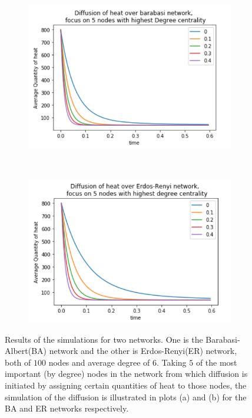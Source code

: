 \documentclass[10pt,a4paper]{article}
\begin{document}
\begin{figure}[!h]
	\centering
	\begin{subfigure}[b]{0.45\textwidth}
		\includegraphics[width= \textwidth]{images/barabasi-average.png}
		\caption{}
		\label{}
	\end{subfigure}~
	\begin{subfigure}[b]{0.45\textwidth}
		\includegraphics[width= \textwidth]{images/E-R-average.png}
		\caption{}
		\label{}
	\end{subfigure}
    \caption{ Results of the simulations for two networks. One is the Barabasi-Albert(BA) network and  the other is Erdos-Renyi(ER) network, both of $100$ nodes and average degree of $6$. Taking $5$ of the most important (by degree) nodes in the network from which diffusion is initiated by assigning certain quantities of heat to those nodes, the simulation of the diffusion is illustrated in plots (a) and (b) for the BA and ER networks respectively.}
    \label{key}
\end{figure}
\end{document}
